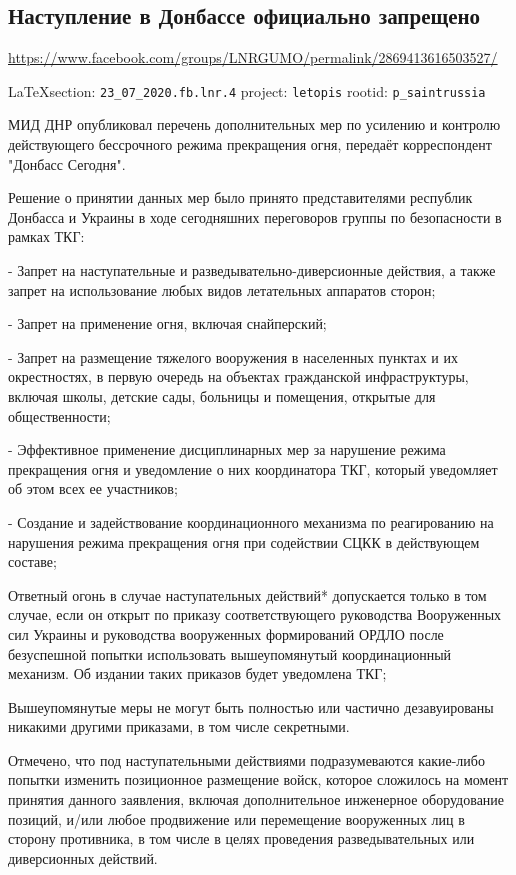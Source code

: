  
 
\subsection{Наступление в Донбассе официально запрещено}
\label{sec:23_07_2020.fb.lnr.4}
\url{https://www.facebook.com/groups/LNRGUMO/permalink/2869413616503527/}

\vspace{0.5cm}
{\small\LaTeX section: \verb|23_07_2020.fb.lnr.4| project: \verb|letopis| rootid: \verb|p_saintrussia|}
\vspace{0.5cm}

МИД ДНР опубликовал перечень дополнительных мер по усилению и контролю
действующего бессрочного режима прекращения огня, передаёт корреспондент
"Донбасс Сегодня".

Решение о принятии данных мер было принято представителями республик Донбасса и
Украины в ходе сегодняшних переговоров группы по безопасности в рамках ТКГ:

- Запрет на наступательные и разведывательно-диверсионные действия, а также
запрет на использование любых видов летательных аппаратов сторон;

- Запрет на применение огня, включая снайперский;

- Запрет на размещение тяжелого вооружения в населенных пунктах и их
окрестностях, в первую очередь на объектах гражданской инфраструктуры, включая
школы, детские сады, больницы и помещения, открытые для общественности;

- Эффективное применение дисциплинарных мер за нарушение режима прекращения
огня и уведомление о них координатора ТКГ, который уведомляет об этом всех ее
участников;

- Создание и задействование координационного механизма по реагированию на
нарушения режима прекращения огня при содействии СЦКК в действующем составе;

Ответный огонь в случае наступательных действий* допускается только в том
случае, если он открыт по приказу соответствующего руководства Вооруженных сил
Украины и руководства вооруженных формирований ОРДЛО после безуспешной попытки
использовать вышеупомянутый координационный механизм. Об издании таких приказов
будет уведомлена ТКГ;

Вышеупомянутые меры не могут быть полностью или частично дезавуированы никакими
другими приказами, в том числе секретными.

Отмечено, что под наступательными действиями подразумеваются какие-либо попытки
изменить позиционное размещение войск, которое сложилось на момент принятия
данного заявления, включая дополнительное инженерное оборудование позиций,
и/или любое продвижение или перемещение вооруженных лиц в сторону противника, в
том числе в целях проведения разведывательных или диверсионных действий.

